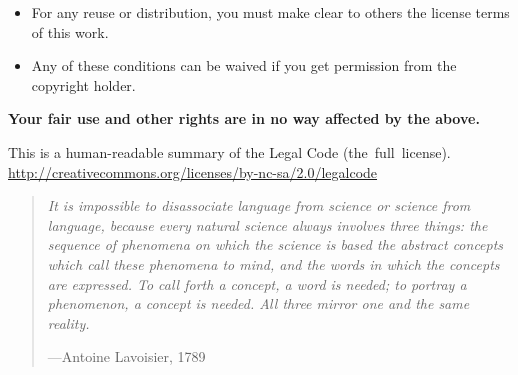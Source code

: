 \documentclass[10pt,american,pdftex]{book}
\begin{document}
\begin{itemize}
\item For any reuse or distribution, you must make clear to others the
license terms of this work.
 
\item Any of these conditions can be waived if you get permission from the copyright holder.
\end{itemize}

\begin{center}
\textbf{Your fair use and other rights are in no way affected by the above.}

\medskip
This is a human-readable summary of the Legal Code
{\def\UrlLeft#1\UrlRight{(the\ full\ license).}
\url{http://creativecommons.org/licenses/by-nc-sa/2.0/legalcode}}

\end{center}


\cleardoublepage

\vspace*{100pt}
\begin{quotation}
\noindent\emph{%
It is impossible to disassociate language from science or science from
language, because every natural science always involves three things:
the sequence of phenomena on which the science is based the abstract
concepts which call these phenomena to mind, and the words in which
the concepts are expressed. To call forth a concept, a word is needed;
to portray a phenomenon, a concept is needed. All three mirror one and
the same reality.}

\begin{flushright}
---Antoine Lavoisier, 1789
\end{flushright}
\end{quotation}


\cleardoublepage
\pagestyle{headings}
\tableofcontents
\makeatletter
\renewcommand\numberline[1]{\hb@xt@\@tempdima{#1\hfil}}
\makeatother
\setcounter{tocdepth}{4}
\sectionlabelfalse


\vfill\pagebreak
\sectionlabeltrue
\setcounter{sectionlr}{4}
\setcounter{page}{1}














\cleardoublepage
{}
\printindex
\end{document}
